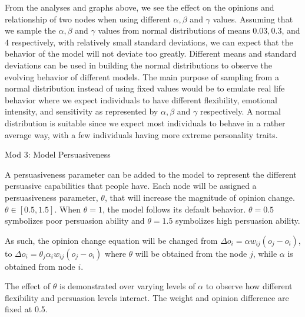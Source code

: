 \documentclass[11pt]{article}
\begin{document}
From the analyses and graphs above, we see the effect on the opinions
and relationship of two nodes when using different \(\alpha,\beta\) and
\(\gamma\) values. Assuming that we sample the \(\alpha,\beta\) and
\(\gamma\) values from normal distributions of means \(0.03,0.3\), and
\(4\) respectively, with relatively small standard deviations, we can
expect that the behavior of the model will not deviate too greatly.
Different means and standard deviations can be used in building the
normal distributions to observe the evolving behavior of different
models. The main purpose of sampling from a normal distribution instead
of using fixed values would be to emulate real life behavior where we
expect individuals to have different flexibility, emotional intensity,
and sensitivity as represented by \(\alpha,\beta\) and \(\gamma\)
respectively. A normal distribution is suitable since we expect most
individuals to behave in a rather average way, with a few individuals
having more extreme personality traits.

    Mod 3: Model Persuasiveness

A persuasiveness parameter can be added to the model to represent the
different persuasive capabilities that people have. Each node will be
assigned a persuasiveness parameter, \(\theta\), that will increase the
magnitude of opinion change. \(\theta \in [0.5,1.5]\). When
\(\theta = 1\), the model follows its default behavior. \(\theta=0.5\)
symbolizes poor persuasion ability and \(\theta=1.5\) symbolizes high
persuasion ability.

As such, the opinion change equation will be changed from
\(\Delta o_i = \alpha w_{ij}(o_j - o_i)\), to
\(\Delta o_i = \theta_j\alpha_i w_{ij}(o_j - o_i)\) where \(\theta\)
will be obtained from the node \(j\), while \(\alpha\) is obtained from
node \(i\).

The effect of \(\theta\) is demonstrated over varying levels of
\(\alpha\) to observe how different flexibility and persuasion levels
interact. The weight and opinion difference are fixed at 0.5.
\end{document}
